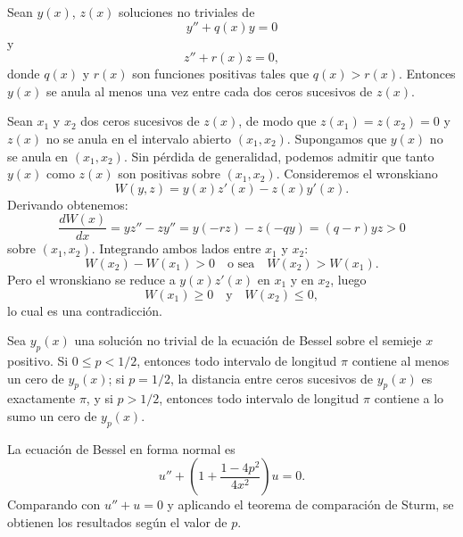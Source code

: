 \begin{theorem}
	Sean $y(x)$, $z(x)$ soluciones no triviales de
	$$y'' + q(x)y = 0$$
	y
	$$z'' + r(x)z = 0,$$
	donde $q(x)$ y $r(x)$ son funciones positivas tales que $q(x) > r(x)$. Entonces $y(x)$ se anula al menos una vez entre cada dos ceros sucesivos de $z(x)$.
\end{theorem}
\begin{demo}
	Sean $x_1$ y $x_2$ dos ceros sucesivos de $z(x)$, de modo que $z(x_1) = z(x_2) = 0$ y $z(x)$ no se anula en el intervalo abierto $(x_1, x_2)$. Supongamos que $y(x)$ no se anula en $(x_1, x_2)$. Sin pérdida de generalidad, podemos admitir que tanto $y(x)$ como $z(x)$ son positivas sobre $(x_1, x_2)$. Consideremos el wronskiano
	$$W(y, z) = y(x)z'(x) - z(x)y'(x).$$
	Derivando obtenemos:
	$$\frac{dW(x)}{dx} = yz'' - zy'' = y(-rz) - z(-qy) = (q - r)yz > 0$$
	sobre $(x_1, x_2)$. Integrando ambos lados entre $x_1$ y $x_2$:
	$$W(x_2) - W(x_1) > 0 \quad \text{o sea} \quad W(x_2) > W(x_1).$$
	Pero el wronskiano se reduce a $y(x)z'(x)$ en $x_1$ y en $x_2$, luego
	$$W(x_1) \geq 0 \quad \text{y} \quad W(x_2) \leq 0,$$
	lo cual es una contradicción.
\end{demo}

\begin{theorem}
	Sea $y_p(x)$ una solución no trivial de la ecuación de Bessel sobre el semieje $x$ positivo. Si $0 \leq p < 1/2$, entonces todo intervalo de longitud $\pi$ contiene al menos un cero de $y_p(x)$; si $p = 1/2$, la distancia entre ceros sucesivos de $y_p(x)$ es exactamente $\pi$, y si $p > 1/2$, entonces todo intervalo de longitud $\pi$ contiene a lo sumo un cero de $y_p(x)$.
\end{theorem}
\begin{demo}
	La ecuación de Bessel en forma normal es
	$$u'' + \left( 1 + \frac{1 - 4p^2}{4x^2} \right) u = 0.$$
	Comparando con $u'' + u = 0$ y aplicando el teorema de comparación de Sturm, se obtienen los resultados según el valor de $p$.
\end{demo}

